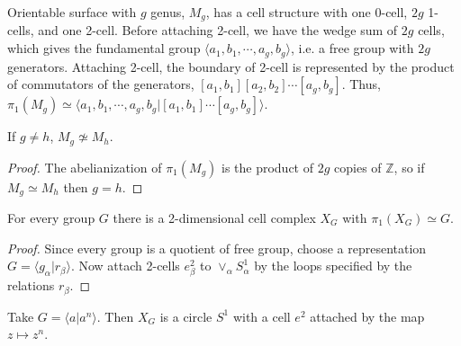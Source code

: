 \begin{exmp} Orientable surface with $g$ genus, $M_g$, has a cell structure with one 0-cell, $2g$ 1-cells, and one 2-cell. Before attaching 2-cell, we have the wedge sum of $2g$ cells, which gives the fundamental group $\langle a_1,b_1,\cdots, a_g, b_g\rangle$, i.e. a free group with $2g$ generators. Attaching 2-cell, the boundary of 2-cell is represented by the product of commutators of the generators, $[a_1,b_1][a_2,b_2]\cdots[a_g,b_g]$. Thus, $\pi_1(M_g)\simeq \langle a_1,b_1,\cdots,a_g,b_g|[a_1,b_1]\cdots[a_g,b_g]\rangle$.
\end{exmp}
\begin{cor} If $g\neq h$, $M_g\not\simeq M_h$.
\end{cor}
\begin{proof}
The abelianization of $\pi_1(M_g)$ is the product of $2g$ copies of $\mathbb{Z}$, so if $M_g\simeq M_h$ then $g=h$.
\end{proof}

\begin{cor} For every group $G$ there is a 2-dimensional cell complex $X_G$ with $\pi_1(X_G)\simeq G$.
\end{cor}
\begin{proof} Since every group is a quotient of free group, choose a representation $G=\langle g_\alpha|r_\beta\rangle$. Now attach 2-cells $e_\beta^2$ to $\vee_\alpha S_\alpha^1$ by the loops specified by the relations $r_\beta$.
\end{proof}

\begin{exmp} Take $G=\langle a|a^n\rangle$. Then $X_G$ is a circle $S^1$ with a cell $e^2$ attached by the map $z\mapsto z^n$. 
\end{exmp}

